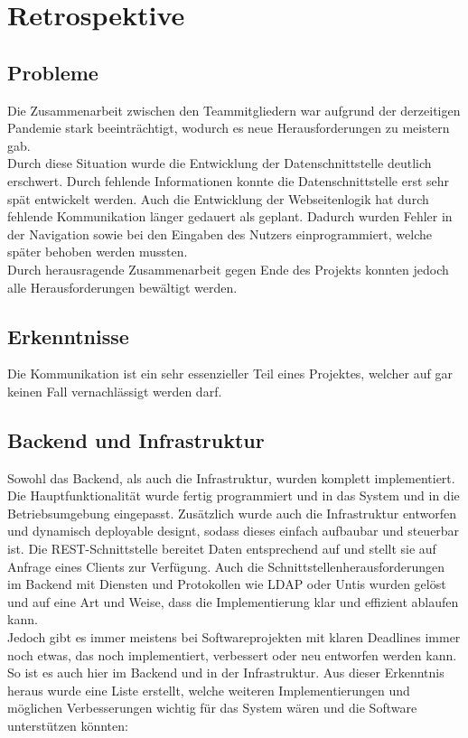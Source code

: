 \chapter{Retrospektive}
\section{Probleme}
Die Zusammenarbeit zwischen den Teammitgliedern war aufgrund der derzeitigen Pandemie stark beeinträchtigt, wodurch es neue Herausforderungen zu meistern gab.\\

Durch diese Situation wurde die Entwicklung der Datenschnittstelle deutlich erschwert. Durch fehlende Informationen konnte die Datenschnittstelle erst sehr spät entwickelt werden. Auch die Entwicklung der Webseitenlogik hat durch fehlende Kommunikation länger gedauert als geplant. Dadurch wurden Fehler in der Navigation sowie bei den Eingaben des Nutzers einprogrammiert, welche später behoben werden mussten.\\

Durch herausragende Zusammenarbeit gegen Ende des Projekts konnten jedoch alle Herausforderungen bewältigt werden.
\section{Erkenntnisse}
Die Kommunikation ist ein sehr essenzieller Teil eines Projektes, welcher auf gar keinen Fall vernachlässigt werden darf.

\newpage

\section{Backend und Infrastruktur}

Sowohl das Backend, als auch die Infrastruktur, wurden komplett implementiert. Die Hauptfunktionalität wurde fertig programmiert und in das System und in die Betriebsumgebung eingepasst. Zusätzlich wurde auch die Infrastruktur entworfen und dynamisch deployable designt, sodass dieses einfach aufbaubar und steuerbar ist. Die REST-Schnittstelle bereitet Daten entsprechend auf und stellt sie auf Anfrage eines Clients zur Verfügung. Auch die Schnittstellenherausforderungen im Backend mit Diensten und Protokollen wie LDAP oder Untis wurden gelöst und auf eine Art und Weise, dass die Implementierung klar und effizient ablaufen kann.\\

Jedoch gibt es immer meistens bei Softwareprojekten mit klaren Deadlines immer noch etwas, das noch implementiert, verbessert oder neu entworfen werden kann. So ist es auch hier im Backend und in der Infrastruktur. Aus dieser Erkenntnis heraus wurde eine Liste erstellt, welche weiteren Implementierungen und möglichen Verbesserungen wichtig für das System wären und die Software unterstützen könnten:

